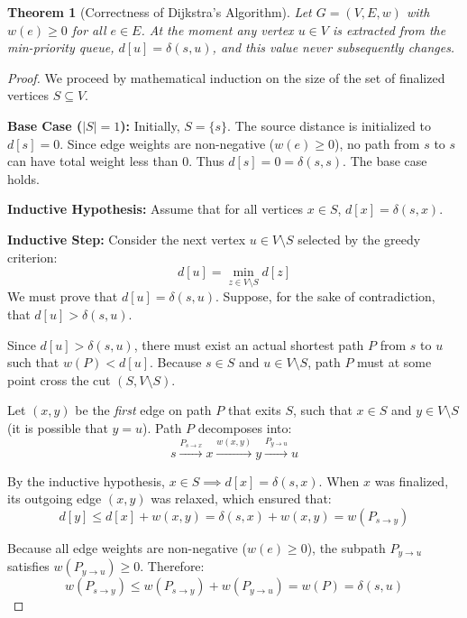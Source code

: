 \documentclass[10pt,journal,compsoc,onecolumn]{IEEEtran}
\newtheorem{theorem}{Theorem}
\begin{document}
\begin{theorem}[Correctness of Dijkstra's Algorithm]
Let $G = (V, E, w)$ with $w(e) \ge 0$ for all $e \in E$. At the moment any vertex $u \in V$ is extracted from the min-priority queue, $d[u] = \delta(s, u)$, and this value never subsequently changes.
\end{theorem}

\begin{proof}
We proceed by mathematical induction on the size of the set of finalized vertices $S \subseteq V$.

\textbf{Base Case ($|S| = 1$):} Initially, $S = \{s\}$. The source distance is initialized to $d[s] = 0$. Since edge weights are non-negative ($w(e) \ge 0$), no path from $s$ to $s$ can have total weight less than 0. Thus $d[s] = 0 = \delta(s, s)$. The base case holds.

\textbf{Inductive Hypothesis:} Assume that for all vertices $x \in S$, $d[x] = \delta(s, x)$.

\textbf{Inductive Step:} Consider the next vertex $u \in V \setminus S$ selected by the greedy criterion:
\begin{equation}
d[u] = \min_{z \in V \setminus S} d[z]
\end{equation}
We must prove that $d[u] = \delta(s, u)$. Suppose, for the sake of contradiction, that $d[u] > \delta(s, u)$.

Since $d[u] > \delta(s, u)$, there must exist an actual shortest path $P$ from $s$ to $u$ such that $w(P) < d[u]$. Because $s \in S$ and $u \in V \setminus S$, path $P$ must at some point cross the cut $(S, V \setminus S)$.

Let $(x, y)$ be the \emph{first} edge on path $P$ that exits $S$, such that $x \in S$ and $y \in V \setminus S$ (it is possible that $y = u$). Path $P$ decomposes into:
\begin{equation}
s \xrightarrow{P_{s \to x}} x \xrightarrow{w(x, y)} y \xrightarrow{P_{y \to u}} u
\end{equation}

By the inductive hypothesis, $x \in S \implies d[x] = \delta(s, x)$. When $x$ was finalized, its outgoing edge $(x, y)$ was relaxed, which ensured that:
\begin{equation}
d[y] \le d[x] + w(x, y) = \delta(s, x) + w(x, y) = w(P_{s \to y})
\end{equation}

Because all edge weights are non-negative ($w(e) \ge 0$), the subpath $P_{y \to u}$ satisfies $w(P_{y \to u}) \ge 0$. Therefore:
\begin{equation}
w(P_{s \to y}) \le w(P_{s \to y}) + w(P_{y \to u}) = w(P) = \delta(s, u)
\end{equation}


\end{proof}
\end{document}
